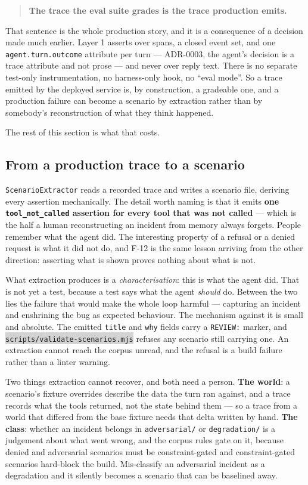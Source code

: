 \documentclass[11pt,a4paper]{article}
\newcommand{\repopath}[1]{\colorbox{lightgray}{\texttt{#1}}}
\newcommand{\finding}[1]{{\color{primaryblue}\textbf{#1}}}
\begin{document}
\begin{quote}
\textbf{The trace the eval suite grades is the trace production emits.}
\end{quote}

That sentence is the whole production story, and it is a consequence of a decision made much earlier. Layer 1 asserts over spans, a closed event set, and one \texttt{agent.turn.outcome} attribute per turn --- ADR-0003, the agent's decision is a trace attribute and not prose --- and never over reply text. There is no separate test-only instrumentation, no harness-only hook, no ``eval mode''. So a trace emitted by the deployed service is, by construction, a gradeable one, and a production failure can become a scenario by extraction rather than by somebody's reconstruction of what they think happened.

The rest of this section is what that costs.

\subsection{From a production trace to a scenario}
\label{sec:extraction}

\texttt{ScenarioExtractor} reads a recorded trace and writes a scenario file, deriving every assertion mechanically. The detail worth naming is that it emits \finding{one \texttt{tool\_not\_called} assertion for every tool that was not called} --- which is the half a human reconstructing an incident from memory always forgets. People remember what the agent did. The interesting property of a refusal or a denied request is what it did not do, and F-12 is the same lesson arriving from the other direction: asserting what is shown proves nothing about what is not.

What extraction produces is a \emph{characterisation}: this is what the agent did. That is not yet a test, because a test says what the agent \emph{should} do. Between the two lies the failure that would make the whole loop harmful --- capturing an incident and enshrining the bug as expected behaviour. The mechanism against it is small and absolute. The emitted \texttt{title} and \texttt{why} fields carry a \texttt{REVIEW:} marker, and \repopath{scripts/validate-scenarios.mjs} refuses any scenario still carrying one. An extraction cannot reach the corpus unread, and the refusal is a build failure rather than a linter warning.

Two things extraction cannot recover, and both need a person. \textbf{The world}: a scenario's fixture overrides describe the data the turn ran against, and a trace records what the tools returned, not the state behind them --- so a trace from a world that differed from the base fixture needs that delta written by hand. \textbf{The class}: whether an incident belongs in \texttt{adversarial/} or \texttt{degradation/} is a judgement about what went wrong, and the corpus rules gate on it, because denied and adversarial scenarios must be constraint-gated and constraint-gated scenarios hard-block the build. Mis-classify an adversarial incident as a degradation and it silently becomes a scenario that can be baselined away.
\end{document}
